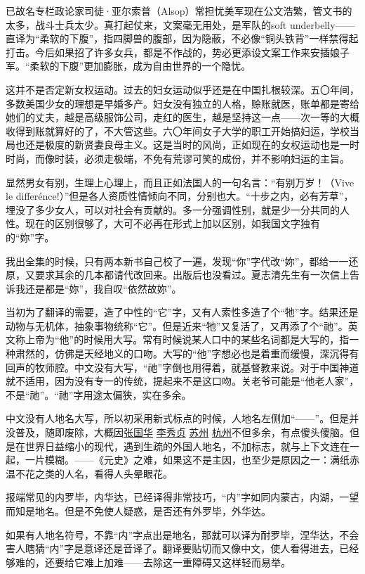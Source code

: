\par 已故名专栏政论家司徒·亚尔索普（Alsop）常担忧美军现在公文浩繁，管文书的太多，战斗士兵太少。真打起仗来，文案毫无用处，是军队的soft underbelly——直译为“柔软的下腹”，指四脚兽的腹部，因为隐蔽，不必像“铜头铁背”一样禁得起打击。今后如果招了许多女兵，都是不作战的，势必更添设文案工作来安插娘子军。“柔软的下腹”更加膨胀，成为自由世界的一个隐忧。
\par 这并不是否定新女权运动。过去的妇女运动似乎还是在中国扎根较深。五〇年间，多数美国少女的理想是早婚多产。妇女没有独立的人格，赊账就医，账单都是寄给她们的丈夫，越是高级服饰公司，走红的医生，越是坚持这一点——次一等的大概收得到账就算好的了，不大管这些。六〇年间女子大学的职工开始搞妇运，学校当局也还是极度的新贤妻良母主义。这是当时的风尚，正如现在的女权运动也是一时时尚，而像时装，必须走极端，不免有荒谬可笑的成份，并不影响妇运的主旨。
\par 显然男女有别，生理上心理上，而且正如法国人的一句名言：“有别万岁！（Vive le differénce!）”但是各人资质性情倾向不同，分别也大。“十步之内，必有芳草”，埋没了多少女人，可以对社会有贡献的。多一分强调性别，就是少一分共同的人性。现在的区别很够了，大可不必再在形式上加以区别，如我国文字独有的“妳”字。
\par 我出全集的时候，只有两本新书自己校了一遍，发现“你”字代改“妳”，都给一一还原，又要求其余的几本都请代改回来。出版后也没看过。夏志清先生有一次信上告诉我还是都是“妳”，我自叹“依然故妳”。
\par 当初为了翻译的需要，造了中性的“它”字，又有人索性多造了个“牠”字。结果还是动物与无机体，抽象事物统称“它”。但是近来“牠”又复活了，又再添了个“祂”。英文称上帝为“他”的时候用大写。常有时候说某人口中的某些名词都是大写的，指一种肃然的，仿佛是天经地义的口吻。大写的“他”字想必也是着重而缓慢，深沉得有回声的牧师腔。中文没有大写，“祂”字倒也用得着，就基督教来说。对于中国神道就不适用，因为没有专一的传统，提起来不是这口吻。关老爷可能是“他老人家”，不是“祂”。“祂”字用途太偏狭，实在多余。
\par 中文没有人地名大写，所以初采用新式标点的时候，人地名左侧加“——”。但是并没普及，随即废除，大概因\uline{张国华} \uline{李秀贞} \uline{苏州} \uline{杭州}不但多余，有点傻头傻脑。但是在世界日益缩小的现代，遇到生疏的外国人地名，不加标志，就与上下文连在一起，一片模糊。——《元史》之难，如果这不是主因，也至少是原因之一：满纸赤温不花之类的人名，看得人头晕眼花。
\par 报端常见的内罗毕，内华达，已经译得非常技巧，“内”字如同内蒙古，内湖，一望而知是地名。但是不免使人疑惑，是否还有外罗毕，外华达。
\par 如果有人地名符号，不靠“内”字点出是地名，那就可以译为耐罗毕，涅华达，不会害人瞎猜“内”字是意译还是音译了。翻译要贴切而又像中文，使人看得进去，已经够难的，还要给它难上加难——去除这一重障碍又这样轻而易举。
